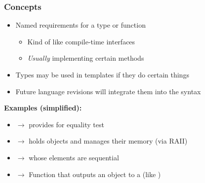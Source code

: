 \documentclass[glossy]{beamer}
\begin{document}

\begin{frame}[fragile=singleslide]
  \frametitle{Concepts}

  \begin{itemize}
    \item Named requirements for a type or function
    \begin{itemize}
      \item Kind of like compile-time interfaces
      \item \emph{Usually} implementing certain methods
    \end{itemize}
    \item Types may be used in templates if they do certain things
    \item Future language revisions will integrate them into the syntax
  \end{itemize}

  \textbf{Examples (simplified):}
  \begin{itemize}
    \item {} $\rightarrow$ provides  for equality test
    \item {} $\rightarrow$ holds objects and manages their memory (via RAII)
    \item {} $\rightarrow$  whose elements are sequential
    \item {} $\rightarrow$ Function that outputs an object to a  (like )
  \end{itemize}
\end{frame}

\end{document}
